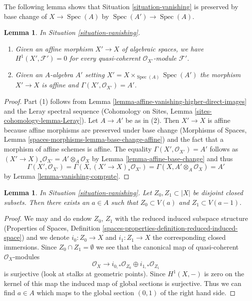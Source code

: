 \documentclass{stacks-project}
\theoremstyle{plain}
\newtheorem{lemma}[subsection]{Lemma}
\theoremstyle{definition}
\theoremstyle{remark}
\numberwithin{equation}{subsection}
\def\Spec{\mathop{\mathrm{Spec}}}
\begin{document}
\noindent
The following lemma shows that Situation \ref{situation-vanishing}
is preserved by base change of $X \to \Spec(A)$ by $\Spec(A') \to \Spec(A)$.

\begin{lemma}
\label{lemma-vanishing-base-change}
In Situation \ref{situation-vanishing}.
\begin{enumerate}
\item Given an affine morphism $X' \to X$ of algebraic spaces, we have
$H^1(X', \mathcal{F}') = 0$ for every quasi-coherent
$\mathcal{O}_{X'}$-module $\mathcal{F}'$.
\item Given an $A$-algebra $A'$ setting $X' = X \times_{\Spec(A)} \Spec(A')$
the morphism $X' \to X$ is affine and $\Gamma(X', \mathcal{O}_{X'}) = A'$.
\end{enumerate}
\end{lemma}

\begin{proof}
Part (1) follows from Lemma \ref{lemma-affine-vanishing-higher-direct-images}
and the Leray spectral sequence (Cohomology on Sites, Lemma
\ref{sites-cohomology-lemma-Leray}). Let $A \to A'$ be as in (2).
Then $X' \to X$ is affine because affine morphisms are preserved under
base change (Morphisms of Spaces, Lemma
\ref{spaces-morphisms-lemma-base-change-affine}) and the
fact that a morphism of affine schemes is affine. The equality
$\Gamma(X', \mathcal{O}_{X'}) = A'$ follows as
$(X' \to X)_*\mathcal{O}_{X'} = A' \otimes_A \mathcal{O}_X$
by Lemma \ref{lemma-affine-base-change} and thus
$$
\Gamma(X', \mathcal{O}_{X'}) =
\Gamma(X, (X' \to X)_*\mathcal{O}_{X'}) =
\Gamma(X, A' \otimes_A \mathcal{O}_X) = A'
$$
by Lemma \ref{lemma-vanishing-compute}.
\end{proof}

\begin{lemma}
\label{lemma-vanishing-separate-closed}
In Situation \ref{situation-vanishing}. Let $Z_0, Z_1 \subset |X|$
be disjoint closed subsets. Then there exists an $a \in A$ such that
$Z_0 \subset V(a)$ and $Z_1 \subset V(a - 1)$.
\end{lemma}

\begin{proof}
We may and do endow $Z_0$, $Z_1$ with the reduced induced subspace structure
(Properties of Spaces, Definition
\ref{spaces-properties-definition-reduced-induced-space}) and we denote
$i_0 : Z_0 \to X$ and $i_1 : Z_1 \to X$ the corresponding closed immersions.
Since $Z_0 \cap Z_1 = \emptyset$ we see that the canonical map of
quasi-coherent $\mathcal{O}_X$-modules
$$
\mathcal{O}_X
\longrightarrow
i_{0, *}\mathcal{O}_{Z_0} \oplus i_{1, *}\mathcal{O}_{Z_1}
$$
is surjective (look at stalks at geometric points). Since $H^1(X, -)$ is
zero on the kernel of this map the induced map of global sections is
surjective. Thus we can find $a \in A$ which maps to the global section
$(0, 1)$ of the right hand side.
\end{proof}
\end{document}
